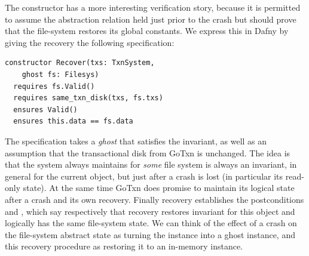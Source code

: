The  constructor has a more interesting verification story, because
it is permitted to assume the abstraction relation held just prior to the crash
but should prove that the file-system restores its global constants. We express
this in Dafny by giving the recovery the following specification:

\begin{verbatim}
constructor Recover(txs: TxnSystem,
    ghost fs: Filesys)
  requires fs.Valid()
  requires same_txn_disk(txs, fs.txs)
  ensures Valid()
  ensures this.data == fs.data
\end{verbatim}

The specification takes a \emph{ghost}  that satisfies the invariant, as
well as an assumption that the transactional disk from GoTxn is unchanged. The
idea is that the system always maintains  for \emph{some} file
system is always an invariant, in general for the current  object, but
just after a crash  is lost (in particular its read-only state). At the
same time GoTxn does promise to maintain its logical state after a crash and its
own recovery. Finally recovery establishes the postconditions  and
, which say respectively that recovery restores
invariant for this  object and logically has the same file-system
state. We can think of the effect of a crash on the file-system abstract state
as turning the  instance into a ghost instance, and this recovery
procedure as restoring it to an in-memory instance.

